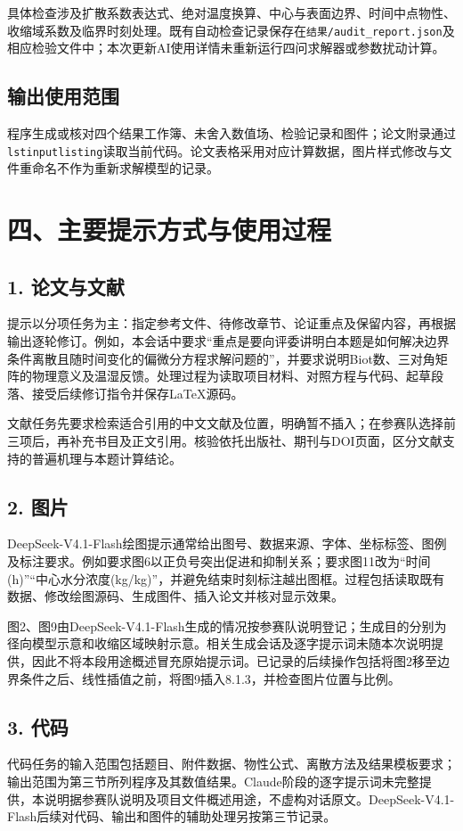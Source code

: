\documentclass[UTF8,a4paper,zihao=-4]{ctexart}
\begin{document}
具体检查涉及扩散系数表达式、绝对温度换算、中心与表面边界、时间中点物性、收缩域系数及临界时刻处理。既有自动检查记录保存在\texttt{结果/audit\_report.json}及相应检验文件中；本次更新AI使用详情未重新运行四问求解器或参数扰动计算。

\subsection*{输出使用范围}
程序生成或核对四个结果工作簿、未舍入数值场、检验记录和图件；论文附录通过\texttt{lstinputlisting}读取当前代码。论文表格采用对应计算数据，图片样式修改与文件重命名不作为重新求解模型的记录。

\clearpage
\section*{四、主要提示方式与使用过程}
\subsection*{1. 论文与文献}
提示以分项任务为主：指定参考文件、待修改章节、论证重点及保留内容，再根据输出逐轮修订。例如，本会话中要求“重点是要向评委讲明白本题是如何解决边界条件离散且随时间变化的偏微分方程求解问题的”，并要求说明Biot数、三对角矩阵的物理意义及温湿反馈。处理过程为读取项目材料、对照方程与代码、起草段落、接受后续修订指令并保存LaTeX源码。

文献任务先要求检索适合引用的中文文献及位置，明确暂不插入；在参赛队选择前三项后，再补充书目及正文引用。核验依托出版社、期刊与DOI页面，区分文献支持的普遍机理与本题计算结论。

\subsection*{2. 图片}
DeepSeek-V4.1-Flash绘图提示通常给出图号、数据来源、字体、坐标标签、图例及标注要求。例如要求图6以正负号突出促进和抑制关系；要求图11改为“时间(h)”“中心水分浓度(kg/kg)”，并避免结束时刻标注越出图框。过程包括读取既有数据、修改绘图源码、生成图件、插入论文并核对显示效果。

图2、图9由DeepSeek-V4.1-Flash生成的情况按参赛队说明登记；生成目的分别为径向模型示意和收缩区域映射示意。相关生成会话及逐字提示词未随本次说明提供，因此不将本段用途概述冒充原始提示词。已记录的后续操作包括将图2移至边界条件之后、线性插值之前，将图9插入8.1.3，并检查图片位置与比例。

\subsection*{3. 代码}
代码任务的输入范围包括题目、附件数据、物性公式、离散方法及结果模板要求；输出范围为第三节所列程序及其数值结果。Claude阶段的逐字提示词未完整提供，本说明据参赛队说明及项目文件概述用途，不虚构对话原文。DeepSeek-V4.1-Flash后续对代码、输出和图件的辅助处理另按第三节记录。
\end{document}
